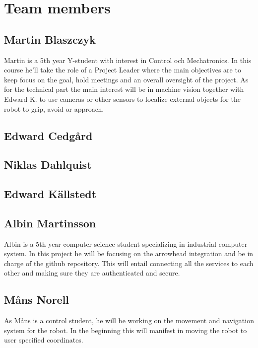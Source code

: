 \section{Team members}

\subsection{Martin Blaszczyk}
Martin is a 5th year Y-student with interest in Control och Mechatronics. 
In this course he'll take the role of a Project Leader where the main objectives
are to keep focus on the goal, hold meetings and an overall oversight of the project. 
As for the technical part the main interest will be in machine vision together with
Edward K. to use cameras or other sensors to localize external objects for the 
robot to grip, avoid or approach. 

\subsection{Edward Cedgård}

\subsection{Niklas Dahlquist}

\subsection{Edward Källstedt}

\subsection{Albin Martinsson}
Albin is a 5th year computer science student specializing in industrial computer system. In this project he will be focusing on the 
arrowhead integration and be in charge of the github repository. This will entail connecting all the services to each other and
making sure they are authenticated and secure. 

\subsection{Måns Norell}
As Måns is a control student, he will be working on the movement and navigation system for the robot. In the beginning this will manifest in moving the robot to user specified coordinates.









